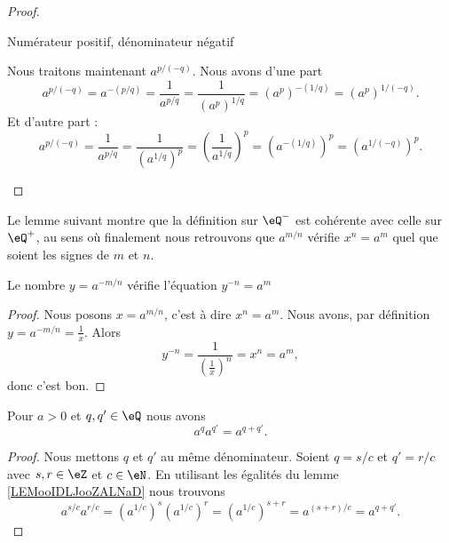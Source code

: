 \begin{proof}
\begin{subproof}
        \item[Numérateur positif, dénominateur négatif]

            Nous traitons maintenant \( a^{p/(-q)}\). Nous avons d'une part
            \begin{equation}
                a^{p/(-q)}=a^{-(p/q)}=\frac{1}{ a^{p/q} }=\frac{1}{ (a^p)^{1/q} }=(a^p)^{-(1/q)}=(a^p)^{1/(-q)}.
            \end{equation}
            Et d'autre part :
            \begin{equation}
                a^{p/(-q)}=\frac{1}{ a^{p/q} }=\frac{1}{ (a^{1/q})^p }=\left( \frac{1}{ a^{1/q} } \right)^p=\left( a^{-(1/q)} \right)^p=(a^{1/(-q)})^p.
            \end{equation}
    \end{subproof}
\end{proof}

Le lemme suivant montre que la définition sur \( \eQ^-\) est cohérente avec celle sur \( \eQ^+\), au sens où finalement nous retrouvons que \( a^{m/n}\) vérifie \( x^n=a^m \) quel que soient les signes de \( m\) et \( n\).
\begin{lemma}
    Le nombre \( y=a^{-m/n}\) vérifie l'équation \( y^{-n}=a^m\)
\end{lemma}

\begin{proof}
    Nous posons \( x=a^{m/n}\), c'est à dire \( x^n=a^m\). Nous avons, par définition \( y=a^{-m/n}=\frac{1}{ x }\). Alors
    \begin{equation}
        y^{-n}=\frac{1}{ \left( \frac{1}{ x } \right)^n }=x^n=a^m,
    \end{equation}
    donc c'est bon.
\end{proof}

\begin{lemma}        \label{LEMooJYGUooHhLASp}
    Pour \( a>0\) et \( q,q'\in \eQ\) nous avons
    \begin{equation}
        a^qa^{q'}=a^{q+q'}.
    \end{equation}
\end{lemma}

\begin{proof}
    Nous mettons \( q\) et \( q'\) au même dénominateur. Soient \( q=s/c\) et \( q'=r/c\) avec \( s,r\in \eZ\) et \( c\in \eN\). En utilisant les égalités du lemme \ref{LEMooIDLJooZALNaD} nous trouvons
    \begin{equation}
        a^{s/c}a^{r/c}=(a^{1/c})^s(a^{1/c})^r=(a^{1/c})^{s+r}=a^{(s+r)/c}=a^{q+q'}.
    \end{equation}
\end{proof}

